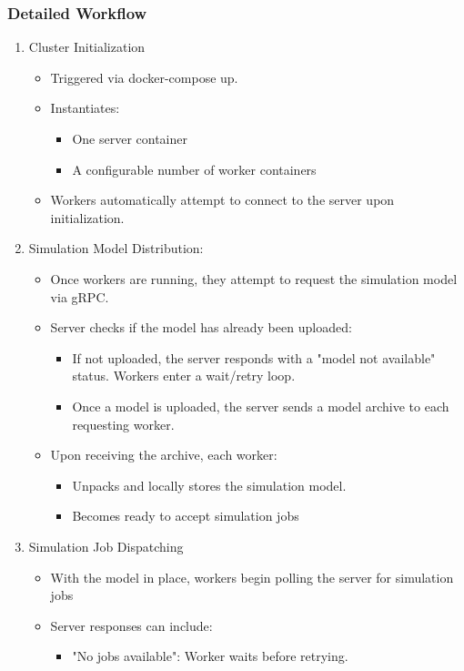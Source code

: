 \subsubsection{Detailed Workflow}
\begin{enumerate}
	\item Cluster Initialization
	\begin{itemize}
		\item Triggered via docker-compose up.
		\item Instantiates:
		\begin{itemize}
			\item One server container
			\item A configurable number of worker containers
		\end{itemize}
		\item Workers automatically attempt to connect to the server upon initialization.
	\end{itemize}
	\item Simulation Model Distribution:
	\begin{itemize}
		\item Once workers are running, they attempt to request the simulation model via gRPC.
		\item Server checks if the model has already been uploaded:
		\begin{itemize}
			\item If not uploaded, the server responds with a "model not available" status. Workers enter a wait/retry loop.
			\item Once a model is uploaded, the server sends a model archive to each requesting worker.
		\end{itemize}
		\item Upon receiving the archive, each worker:
		\begin{itemize}
			\item Unpacks and locally stores the simulation model.
			\item Becomes ready to accept simulation jobs
		\end{itemize}
	\end{itemize}
	\item Simulation Job Dispatching
	\begin{itemize}
		\item With the model in place, workers begin polling the server for simulation jobs
		\item Server responses can include:
		\begin{itemize}
			\item "No jobs available": Worker waits before retrying.

\end{itemize}
\end{itemize}
\end{enumerate}
